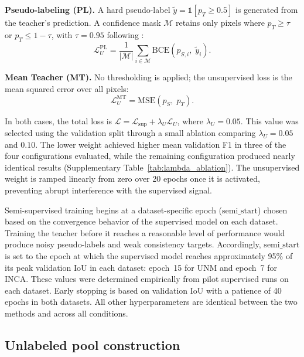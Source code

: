\documentclass[a4paper,fleqn]{cas-dc}
\begin{document}
\textbf{Pseudo-labeling (PL).}
A hard pseudo-label $\tilde{y} = \mathbb{1}[p_T \geq 0.5]$ is generated from the teacher's prediction.
A confidence mask $\mathcal{M}$ retains only pixels where $p_T \geq \tau$ or $p_T \leq 1{-}\tau$, with $\tau{=}0.95$ following \citet{ref_fixmatch}:
\begin{equation}
\mathcal{L}_U^{\text{PL}} = \frac{1}{|\mathcal{M}|} \sum_{i \in \mathcal{M}} \text{BCE}(p_{S,i},\; \tilde{y}_i).
\end{equation}

\textbf{Mean Teacher (MT).}
No thresholding is applied; the unsupervised loss is the mean squared error over all pixels:
\begin{equation}
\mathcal{L}_U^{\text{MT}} = \text{MSE}(p_S,\; p_T).
\end{equation}

In both cases, the total loss is $\mathcal{L} = \mathcal{L}_{\text{sup}} + \lambda_U \mathcal{L}_U$, where $\lambda_U{=}0.05$.
This value was selected using the validation split through a small ablation comparing $\lambda_U = 0.05$ and $0.10$. The lower weight achieved higher mean validation F1 in three of the four configurations evaluated, while the remaining configuration produced nearly identical results (Supplementary Table~\ref{tab:lambda_ablation}).
The unsupervised weight is ramped linearly from zero over 20 epochs once it is activated, preventing abrupt interference with the supervised signal.

Semi-supervised training begins at a dataset-specific epoch ($\text{semi\_start}$) chosen based on the convergence behavior of the supervised model on each dataset.
Training the teacher before it reaches a reasonable level of performance would produce noisy pseudo-labels and weak consistency targets.
Accordingly, $\text{semi\_start}$ is set to the epoch at which the supervised model reaches approximately 95\% of its peak validation IoU in each dataset: epoch~15 for UNM and epoch~7 for INCA.
These values were determined empirically from pilot supervised runs on each dataset.
Early stopping is based on validation IoU with a patience of 40 epochs in both datasets.
All other hyperparameters are identical between the two methods and across all conditions.

\subsection{Unlabeled pool construction}
\label{subsec:pools}
\end{document}
